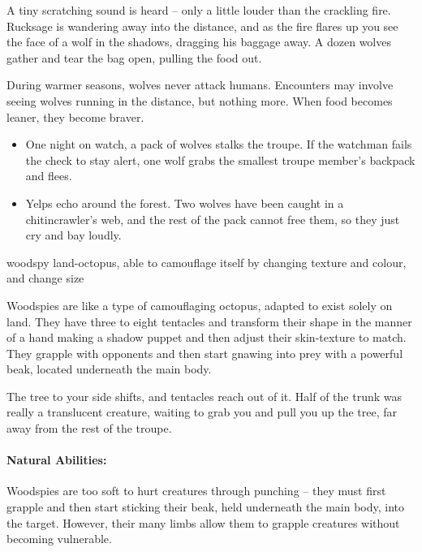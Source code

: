 \begin{multicols}{2}
\begin{boxtext}

  A tiny scratching sound is heard -- only a little louder than the crackling fire.
  Rucksage is wandering away into the distance, and as the fire flares up you see the face of a wolf in the shadows, dragging his baggage away.
  A dozen wolves gather and tear the bag open, pulling the food out.

\end{boxtext}


\showEnc
During warmer seasons, wolves never attack humans.
Encounters may involve seeing wolves running in the distance, but nothing more.
When food becomes leaner, they become braver.

\begin{itemize}
  \item
  One night on watch, a pack of wolves stalks the troupe.
  If the watchman fails the  check to stay alert, one wolf grabs the smallest troupe member's backpack and flees.
  \item
  Yelps echo around the forest.
  Two wolves have been caught in a chitincrawler's web, and the rest of the pack cannot free them, so they just cry and bay loudly.
\end{itemize}

  {woodspy}%
  {land-octopus, able to camouflage itself by changing texture and colour, and change size}%


Woodspies are like a type of camouflaging octopus, adapted to exist solely on land.
They have three to eight tentacles and transform their shape in the manner of a hand making a shadow puppet and then adjust their skin-texture to match.
They grapple with opponents and then start gnawing into prey with a powerful beak, located underneath the main body.

\begin{boxtext}

  The tree to your side shifts, and tentacles reach out of it.
  Half of the trunk was really a translucent creature, waiting to grab you and pull you up the tree, far away from the rest of the troupe.

\end{boxtext}

\paragraph{Natural Abilities:} Woodspies are too soft to hurt creatures through punching -- they must first grapple and then start sticking their beak, held underneath the main body, into the target.
However, their many limbs allow them to grapple creatures without becoming vulnerable.%


\end{multicols}
